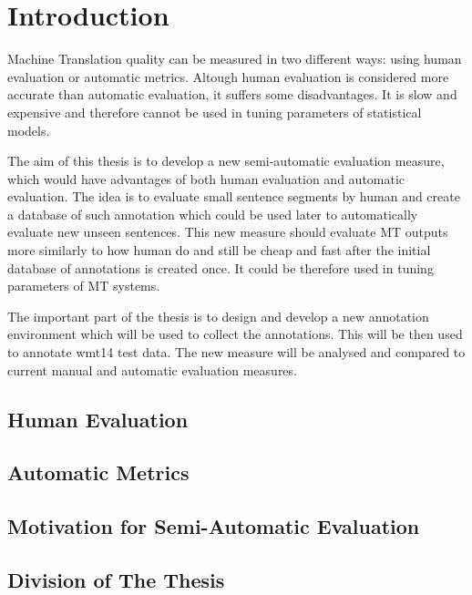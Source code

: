 \chapter{Introduction}


Machine Translation quality can be measured in two different ways: using human
evaluation or automatic metrics.  Altough human evaluation is considered more
accurate than automatic evaluation, it suffers some disadvantages.  It is slow
and expensive and therefore cannot be used in tuning parameters of statistical
models.

The aim of this thesis is to develop a new semi-automatic evaluation measure,
which would have advantages of both human evaluation and automatic evaluation.
The idea is to evaluate small sentence segments by human and create a database
of such annotation which could be used later to automatically evaluate new
unseen sentences.  This new measure should evaluate MT outputs more similarly
to how human do and still be cheap and fast after the initial database of
annotations is created once. It could be therefore used in tuning parameters of
MT systems.

The important part of the thesis is to design and develop a new annotation
environment which will be used to collect the annotations. This will be then used
to annotate wmt14 test data. The new measure will be analysed and compared to
current manual and automatic evaluation measures. 

\nocite{wmt14-overview-paper}

\section{Human Evaluation}

\section{Automatic Metrics}

\section{Motivation for Semi-Automatic Evaluation}

\section{Division of The Thesis}






